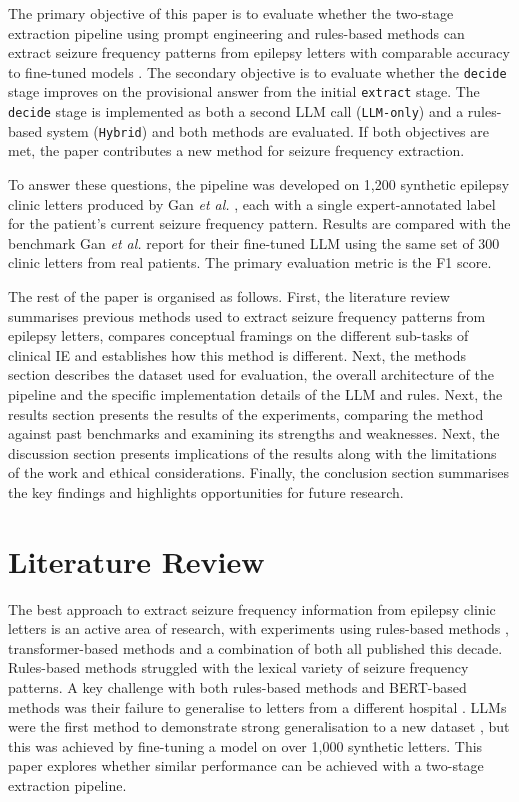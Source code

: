\documentclass[conference]{IEEEtran}
\begin{document}
The primary objective of this paper is to evaluate whether 
the two-stage extraction pipeline using prompt engineering
and rules-based methods can extract seizure frequency patterns from epilepsy letters 
with comparable accuracy to fine-tuned models \cite{b3}. The secondary 
objective is to evaluate whether the \texttt{decide} stage improves 
on the provisional answer from the initial \texttt{extract} stage. 
The \texttt{decide} stage is implemented as both a second
LLM call (\texttt{LLM-only}) and a rules-based 
system (\texttt{Hybrid}) and both methods are evaluated.
If both objectives are met, the paper contributes 
a new method for seizure frequency extraction.

To answer these questions, the pipeline was developed on 
1,200 synthetic epilepsy clinic letters produced by Gan 
\emph{et al.} \cite{b3}, each with a single expert-annotated 
label for the patient's current seizure frequency pattern. 
Results are compared with the benchmark Gan \emph{et al.} 
report for their fine-tuned LLM using the same set of 300 clinic 
letters from real patients. The primary evaluation metric
is the F1 score. 

The rest of the paper is organised as follows. First, the
literature review summarises previous methods used to extract
seizure frequency patterns from epilepsy letters, compares
conceptual framings on the different sub-tasks of clinical IE
and establishes how this method is different. Next, the methods
section describes the dataset used for evaluation, the overall
architecture of the pipeline and the specific implementation
details of the LLM and rules. Next, the results section
presents the results of the experiments, comparing the method
against past benchmarks and examining its strengths and
weaknesses. Next, the discussion section presents implications of the results
along with the limitations of the work and ethical considerations. 
Finally, the conclusion section summarises the key
findings and highlights opportunities for future research.

\section{Literature Review}

The best approach to extract seizure frequency 
information from epilepsy clinic letters is an active area 
of research, with experiments using rules-based methods \cite{b7, b8}, 
transformer-based methods \cite{b3, b6, b9, b10} and a 
combination of both \cite{b11, b12} all published this decade. 
Rules-based methods struggled with the 
lexical variety of seizure frequency patterns. A key 
challenge with both rules-based methods and BERT-based 
methods was their failure to generalise to letters from a 
different hospital \cite{b8, b12}. LLMs were the first method
to demonstrate strong generalisation to a new dataset \cite{b3},
but this was achieved by fine-tuning a model on over 1,000
synthetic letters. This paper explores whether similar
performance can be achieved with a two-stage extraction 
pipeline.
\end{document}
